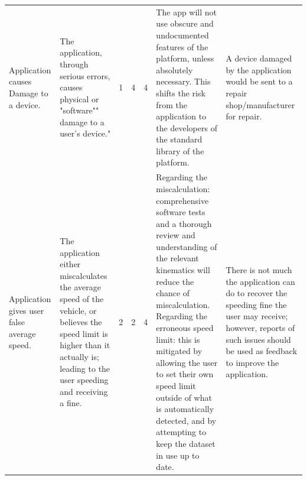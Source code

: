 \documentclass[11pt, a4paper, notitlepage]{report}
\begin{document}
\begin{table}
\begin{tabular}{p{} p{} c c c p{} p{}}
        Application causes Damage to a device. &
        The application, through serious errors, causes physical or "software"" damage to a user's device." &
        1 &
        4 &
        4 &
        The app will not use obscure and undocumented features of the platform, unless absolutely necessary. This shifts the risk from the application to the developers of the standard library of the platform. &
        A device damaged by the application would be sent to a repair shop/manufacturer for repair. \\
        Application gives user false average speed. &
        The application either miscalculates the average speed of the vehicle, or believes the speed limit is higher than it actually is; leading to the user speeding and receiving a fine. &
        2 &
        2 &
        4 &
        Regarding the miscalculation: comprehensive software tests and a thorough review and understanding of the relevant kinematics will reduce the chance of miscalculation. Regarding the erroneous speed limit: this is mitigated by allowing the user to set their own speed limit outside of what is automatically detected, and by attempting to keep the dataset in use up to date. &
        There is not much the application can do to recover the speeding fine the user may receive; however, reports of such issues should be used as feedback to improve the application.
    \end{tabular}
\end{table}


\end{document}
